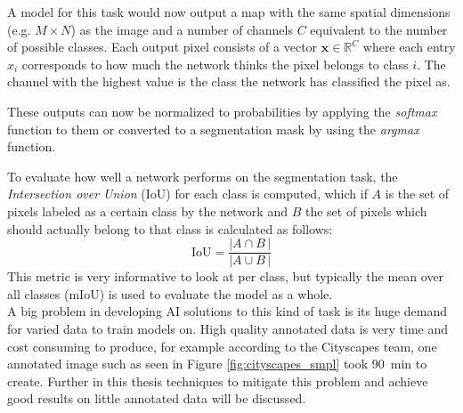 A model for this task would now output a map with the same spatial dimensions (e.g. $M\times N$) as the image and a number of channels $C$ equivalent to the number of possible classes. Each output pixel consists of a vector $\mathbf{x}\in \mathbb{R}^C$ where each entry $x_i$ corresponds to how much the network thinks the pixel belongs to class $i$. The channel with the highest value is the class the network has classified the pixel as.

These outputs can now be normalized to probabilities by applying the \emph{softmax} function to them or converted to a segmentation mask by using the \emph{argmax} function.

To evaluate how well a network performs on the segmentation task, the \emph{Intersection over Union} (IoU) for each class is computed, which if $A$ is the set of pixels labeled as a certain class by the network and $B$ the set of pixels which should actually belong to that class is calculated as follows:
$$
    \text{IoU} = \frac{\left|A\cap B \,\right|}{\left|A\cup B \,\right|}
$$
This metric is very informative to look at per class, but typically the mean over all classes (mIoU) is used to evaluate the model as a whole.\\

A big problem in developing AI solutions to this kind of task is its huge demand for varied data to train models on. High quality annotated data is very time and cost consuming to produce, for example according to the Cityscapes team, one annotated image such as seen in Figure \ref{fig:cityscapes_smpl} took \SI{90}{min} to create. 
Further in this thesis techniques to mitigate this problem and achieve good results on little annotated data will be discussed.
